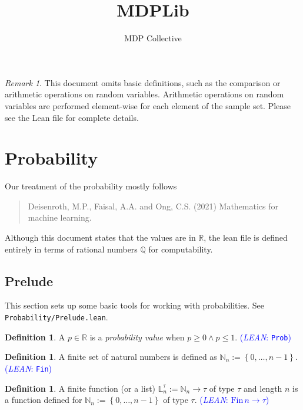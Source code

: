 \documentclass[letterpaper]{article}
\title{MDPLib}
\author{MDP Collective}
\theoremstyle{plain}
\theoremstyle{definition}
\newtheorem{definition}[theorem]{Definition}
\theoremstyle{remark}
\newtheorem{remark}[theorem]{Remark}
\newcommand{\Nats}{\mathbb{N}}
\newcommand{\Real}{\mathbb{R}}
\newcommand{\lean}[1]{\textcolor{blue}{(\emph{LEAN}: \texttt{#1})}}
\begin{document}
\maketitle

\begin{remark}
This document omits basic definitions, such as the comparison or arithmetic operations on random variables. Arithmetic operations on random variables are performed element-wise for each element of the sample set. Please see the Lean file for complete details.
\end{remark}


\section{Probability}

Our treatment of the probability mostly follows
\begin{quote}
  Deisenroth, M.P., Faisal, A.A. and Ong, C.S. (2021) Mathematics for machine learning.
\end{quote}

Although this document states that the values are in $\Real$, the lean file is  defined entirely in terms of rational numbers $\mathbb{Q}$ for computability. 

\subsection{Prelude}

This section sets up some basic tools for working with probabilities. See \texttt{Probability/Prelude.lean}.

\begin{definition} \label{def:probablity-value}
A $p\in \Real$ is a \emph{probability value} when $p \ge 0 \wedge p \le 1$.
\lean{Prob}
\end{definition}

\begin{definition}
A finite set of natural numbers is defined as $\Nats_n := \left\{ 0, \dots , n-1   \right\}$.
\lean{Fin} 
\end{definition}

\begin{definition} \label{def:list}
A finite function (or a list) $\mathbb{L}_n^{\tau} := \Nats_n \to \tau$ of type $\tau$ and length $n$ is a function defined for $\Nats_{n} := \left\{ 0, \dots , n-1 \right\}$ of type $\tau$.
\lean{$\text{Fin}\, n \to \tau$} 
\end{definition}
\end{document}
